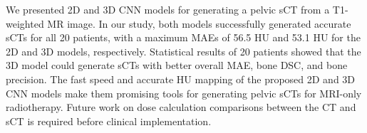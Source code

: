 We presented 2D and 3D CNN models for generating a pelvic sCT from a T1-weighted MR image. In our study, both models successfully generated accurate sCTs for all 20 patients, with a maximum MAEs of 56.5 HU and 53.1 HU for the 2D and 3D models, respectively. Statistical results of 20 patients showed that the 3D model could generate sCTs with better overall MAE, bone DSC, and bone precision. The fast speed and accurate HU mapping of the proposed 2D and 3D CNN models make them promising tools for generating pelvic sCTs for MRI-only radiotherapy. Future work on dose calculation comparisons between the CT and sCT is required before clinical implementation. 